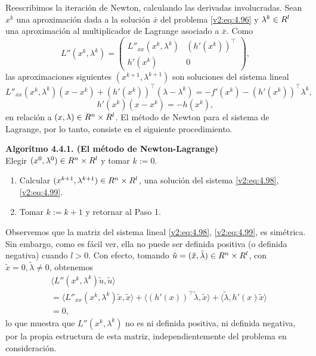 Reescribimos la iteración de Newton, calculando las derivadas involucradas. Sean $x^k$ una aproximación dada a la solución $\bar{x}$ del problema \eqref{v2:eq:4.96} y $\lambda^k \in R^l$ una aproximación al multiplicador de Lagrange asociado a $\bar{x}$. Como
\[
    L''(x^k, \lambda^k) = \begin{pmatrix} L''_{xx}(x^k, \lambda^k) & (h'(x^k))^\top \\ h'(x^k) & 0 \end{pmatrix},
\]
las aproximaciones siguientes $(x^{k+1}, \lambda^{k+1})$ son soluciones del sistema lineal
\begin{equation}
    L''_{xx}(x^k, \lambda^k)(x - x^k) + (h'(x^k))^\top(\lambda - \lambda^k) = -f'(x^k) - (h'(x^k))^\top \lambda^k,
    \label{v2:eq:4.98}
\end{equation}
\begin{equation}
    h'(x^k)(x - x^k) = -h(x^k),
    \label{v2:eq:4.99}
\end{equation}
en relación a $(x, \lambda) \in R^n \times R^l$. El método de Newton para el sistema de Lagrange, por lo tanto, consiste en el siguiente procedimiento.

\noindent \textbf{Algoritmo 4.4.1. (El método de Newton-Lagrange)} \\
Elegir $(x^0, \lambda^0) \in R^n \times R^l$ y tomar $k := 0$.
\begin{enumerate}
    \item Calcular $(x^{k+1}, \lambda^{k+1}) \in R^n \times R^l$, una solución del sistema \eqref{v2:eq:4.98}, \eqref{v2:eq:4.99}.
    \item Tomar $k := k + 1$ y retornar al Paso 1.
\end{enumerate}

Observemos que la matriz del sistema lineal \eqref{v2:eq:4.98}, \eqref{v2:eq:4.99}, es simétrica. Sin embargo, como es fácil ver, ella no puede ser definida positiva (o definida negativa) cuando $l > 0$. Con efecto, tomando $\tilde{u} = (\tilde{x}, \tilde{\lambda}) \in R^n \times R^l$, con $\tilde{x} = 0, \tilde{\lambda} \neq 0$, obtenemos
\begin{align*}
    &\langle L''(x^k, \lambda^k)\tilde{u}, \tilde{u} \rangle \\
    &= \langle L''_{xx}(x^k, \lambda^k)\tilde{x}, \tilde{x} \rangle + \langle (h'(x))^\top\tilde{\lambda}, \tilde{x} \rangle + \langle \tilde{\lambda}, h'(x)\tilde{x} \rangle \\
    &= 0,
\end{align*}
lo que muestra que $L''(x^k, \lambda^k)$ no es ni definida positiva, ni definida negativa, por la propia estructura de esta matriz, independientemente del problema en consideración.

